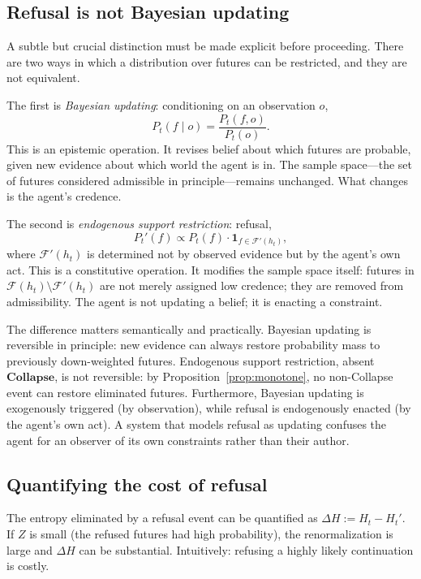 \documentclass[11pt]{article}
\newcommand{\Future}{\mathcal{F}}
\begin{document}
\subsection{Refusal is not Bayesian updating}

A subtle but crucial distinction must be made explicit before proceeding. There
are two ways in which a distribution over futures can be restricted, and they
are not equivalent.

The first is \emph{Bayesian updating}: conditioning on an observation $o$,
\[
P_t(f \mid o) = \frac{P_t(f, o)}{P_t(o)}.
\]
This is an epistemic operation. It revises belief about which futures are
probable, given new evidence about which world the agent is in. The sample
space---the set of futures considered admissible in principle---remains
unchanged. What changes is the agent's credence.

The second is \emph{endogenous support restriction}: refusal,
\[
P_t'(f) \propto P_t(f) \cdot \mathbf{1}_{f \in \Future'(h_t)},
\]
where $\Future'(h_t)$ is determined not by observed evidence but by the agent's
own act. This is a constitutive operation. It modifies the sample space itself:
futures in $\Future(h_t) \setminus \Future'(h_t)$ are not merely assigned low
credence; they are removed from admissibility. The agent is not updating a
belief; it is enacting a constraint.

The difference matters semantically and practically. Bayesian updating is
reversible in principle: new evidence can always restore probability mass to
previously down-weighted futures. Endogenous support restriction, absent
$\mathbf{Collapse}$, is not reversible: by Proposition~\ref{prop:monotone}, no
non-Collapse event can restore eliminated futures. Furthermore, Bayesian updating
is exogenously triggered (by observation), while refusal is endogenously enacted
(by the agent's own act). A system that models refusal as updating confuses the
agent for an observer of its own constraints rather than their author.

\subsection{Quantifying the cost of refusal}

The entropy eliminated by a refusal event can be quantified as
$\Delta H := H_t - H_t'$. If $Z$ is small (the refused futures had high
probability), the renormalization is large and $\Delta H$ can be substantial.
Intuitively: refusing a highly likely continuation is costly.
\end{document}
